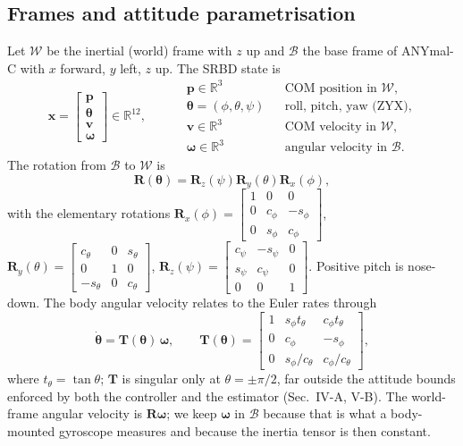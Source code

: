 \documentclass[11pt]{article}
\newcommand{\R}{\mathbb{R}}
\newcommand{\bx}{\bm{x}}\newcommand{\bu}{\bm{u}}\newcommand{\bw}{\bm{w}}\newcommand{\by}{\bm{y}}
\newcommand{\bp}{\bm{p}}\newcommand{\bv}{\bm{v}}\newcommand{\bom}{\bm{\omega}}\newcommand{\bth}{\bm{\theta}}
\newcommand{\Rot}{\bm{R}}\newcommand{\Tm}{\bm{T}}\newcommand{\I}{\bm{I}}
\begin{document}
\subsection{Frames and attitude parametrisation}
Let $\mathcal W$ be the inertial (world) frame with $z$ up and $\mathcal B$ the base frame of ANYmal-C with $x$ forward, $y$ left, $z$ up. The SRBD state is
\begin{equation}
\bx=\begin{bmatrix}\bp\\ \bth\\ \bv\\ \bom\end{bmatrix}\in\R^{12},\qquad
\begin{aligned}
&\bp\in\R^3 &&\text{COM position in }\mathcal W,\\
&\bth=(\phi,\theta,\psi) &&\text{roll, pitch, yaw (ZYX)},\\
&\bv\in\R^3 &&\text{COM velocity in }\mathcal W,\\
&\bom\in\R^3 &&\text{angular velocity in }\mathcal B.
\end{aligned}
\label{eq:state}
\end{equation}
The rotation from $\mathcal B$ to $\mathcal W$ is
\begin{equation}
\Rot(\bth)=\Rot_z(\psi)\Rot_y(\theta)\Rot_x(\phi),
\label{eq:R}
\end{equation}
with the elementary rotations $\Rot_x(\phi)=\left[\begin{smallmatrix}1&0&0\\0&c_\phi&-s_\phi\\0&s_\phi&c_\phi\end{smallmatrix}\right]$, $\Rot_y(\theta)=\left[\begin{smallmatrix}c_\theta&0&s_\theta\\0&1&0\\-s_\theta&0&c_\theta\end{smallmatrix}\right]$, $\Rot_z(\psi)=\left[\begin{smallmatrix}c_\psi&-s_\psi&0\\s_\psi&c_\psi&0\\0&0&1\end{smallmatrix}\right]$. Positive pitch is nose-down. The body angular velocity relates to the Euler rates through
\begin{equation}
\dot{\bth}=\Tm(\bth)\,\bom,\qquad
\Tm(\bth)=\begin{bmatrix}1 & s_\phi t_\theta & c_\phi t_\theta\\ 0 & c_\phi & -s_\phi\\ 0 & s_\phi/c_\theta & c_\phi/c_\theta\end{bmatrix},
\label{eq:T}
\end{equation}
where $t_\theta=\tan\theta$; $\Tm$ is singular only at $\theta=\pm\pi/2$, far outside the attitude bounds enforced by both the controller and the estimator (Sec.~IV-A, V-B). The world-frame angular velocity is $\Rot\bom$; we keep $\bom$ in $\mathcal B$ because that is what a body-mounted gyroscope measures and because the inertia tensor is then constant.
\end{document}

